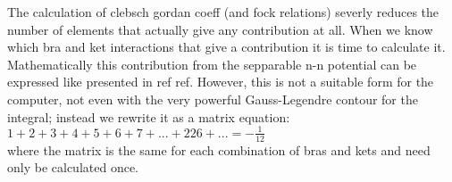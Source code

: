 The calculation of clebsch gordan coeff (and fock relations) severly reduces the number of elements that actually give any contribution at all. 
When we know which bra and ket interactions that give a contribution it is time to calculate it. 
Mathematically this contribution from the sepparable n-n potential can be expressed like presented in ref ref.
However, this is not a suitable form for the computer, not even with the very powerful Gauss-Legendre contour for the integral; instead we rewrite it as a matrix equation:
$1+2+3+4+5+6+7+...+226+... = - \frac{1}{12}$\\
where the matrix is the same for each combination of bras and kets and need only be calculated once.

